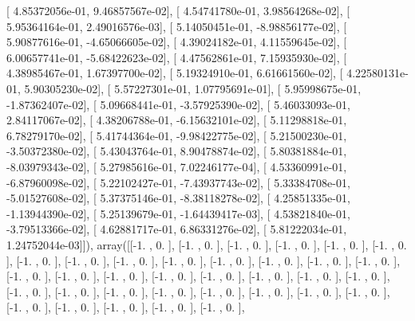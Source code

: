 \documentclass{article}
\begin{document}
       [  4.85372056e-01,   9.46857567e-02],
       [  4.54741780e-01,   3.98564268e-02],
       [  5.95364164e-01,   2.49016576e-03],
       [  5.14050451e-01,  -8.98856177e-02],
       [  5.90877616e-01,  -4.65066605e-02],
       [  4.39024182e-01,   4.11559645e-02],
       [  6.00657741e-01,  -5.68422623e-02],
       [  4.47562861e-01,   7.15935930e-02],
       [  4.38985467e-01,   1.67397700e-02],
       [  5.19324910e-01,   6.61661560e-02],
       [  4.22580131e-01,   5.90305230e-02],
       [  5.57227301e-01,   1.07795691e-01],
       [  5.95998675e-01,  -1.87362407e-02],
       [  5.09668441e-01,  -3.57925390e-02],
       [  5.46033093e-01,   2.84117067e-02],
       [  4.38206788e-01,  -6.15632101e-02],
       [  5.11298818e-01,   6.78279170e-02],
       [  5.41744364e-01,  -9.98422775e-02],
       [  5.21500230e-01,  -3.50372380e-02],
       [  5.43043764e-01,   8.90478874e-02],
       [  5.80381884e-01,  -8.03979343e-02],
       [  5.27985616e-01,   7.02246177e-04],
       [  4.53360991e-01,  -6.87960098e-02],
       [  5.22102427e-01,  -7.43937743e-02],
       [  5.33384708e-01,  -5.01527608e-02],
       [  5.37375146e-01,  -8.38118278e-02],
       [  4.25851335e-01,  -1.13944390e-02],
       [  5.25139679e-01,  -1.64439417e-03],
       [  4.53821840e-01,  -3.79513366e-02],
       [  4.62881717e-01,   6.86331276e-02],
       [  5.81222034e-01,   1.24752044e-03]]), array([[-1.        ,  0.        ],
       [-1.        ,  0.        ],
       [-1.        ,  0.        ],
       [-1.        ,  0.        ],
       [-1.        ,  0.        ],
       [-1.        ,  0.        ],
       [-1.        ,  0.        ],
       [-1.        ,  0.        ],
       [-1.        ,  0.        ],
       [-1.        ,  0.        ],
       [-1.        ,  0.        ],
       [-1.        ,  0.        ],
       [-1.        ,  0.        ],
       [-1.        ,  0.        ],
       [-1.        ,  0.        ],
       [-1.        ,  0.        ],
       [-1.        ,  0.        ],
       [-1.        ,  0.        ],
       [-1.        ,  0.        ],
       [-1.        ,  0.        ],
       [-1.        ,  0.        ],
       [-1.        ,  0.        ],
       [-1.        ,  0.        ],
       [-1.        ,  0.        ],
       [-1.        ,  0.        ],
       [-1.        ,  0.        ],
       [-1.        ,  0.        ],
       [-1.        ,  0.        ],
       [-1.        ,  0.        ],
       [-1.        ,  0.        ],
       [-1.        ,  0.        ],
       [-1.        ,  0.        ],
       [-1.        ,  0.        ],
       [-1.        ,  0.        ],
       [-1.        ,  0.        ],
\end{document}
